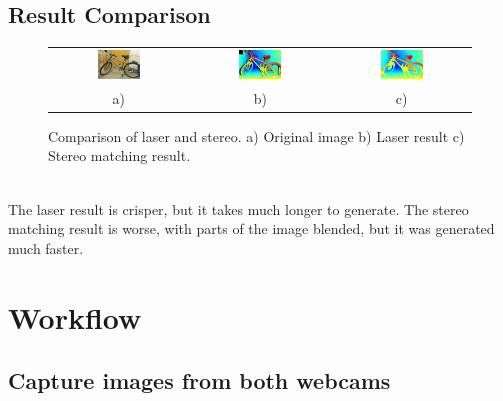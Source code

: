\documentclass[11pt,fleqn]{article}
\begin{document}
\subsection{Result Comparison}
\begin{figure}[!ht]
\centering
\setlength{}
\begin{tabular}{ccc}
\includegraphics[width=0.33\textwidth]{images/_im0-600.jpg} &
\includegraphics[width=0.33\textwidth]{images/disp0GT-600.jpg} &
\includegraphics[width=0.33\textwidth]{images/_disp-600.jpg} \\[2pt]
a) & b) & c) \\
\end{tabular}
\caption{Comparison of laser and stereo. a) Original image b) Laser result c) Stereo matching result.}
\label{fig:result1}
\end{figure}
\\
The laser result is crisper, but it takes much longer to generate. The stereo matching result is worse, with parts of the image blended, but it was generated much faster. 


\section{Workflow}

\subsection{Capture images from both webcams}  
\end{document}
